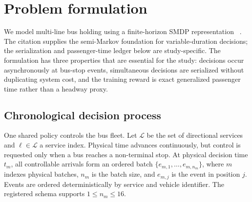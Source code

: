\section{Problem formulation}
\label{sec:problem}

We model multi-line bus holding using a finite-horizon SMDP representation
~\citep{sutton1999between}. The citation supplies the semi-Markov foundation for
variable-duration decisions; the serialization and passenger-time ledger below
are study-specific. The formulation
has three properties that are essential for
the study: decisions occur asynchronously at bus-stop events, simultaneous
decisions are serialized without duplicating system cost, and the training
reward is exact generalized passenger time rather than a headway proxy.

\subsection{Chronological decision process}
\label{sec:problem:smdp}

One shared policy controls the bus fleet. Let $\mathcal{L}$ be the set of
directional services and $\ell\in\mathcal{L}$ a service index. Physical time
advances continuously, but control is
requested only when a bus reaches a non-terminal stop. At physical decision
time $t_m$, all controllable arrivals form an ordered batch
$\{e_{m,1},\ldots,e_{m,n_m}\}$, where $m$ indexes physical batches, $n_m$ is
the batch size, and $e_{m,j}$ is the event in position $j$. Events are ordered
deterministically by service and vehicle identifier. The registered schema
supports $1\leq n_m\leq16$.

